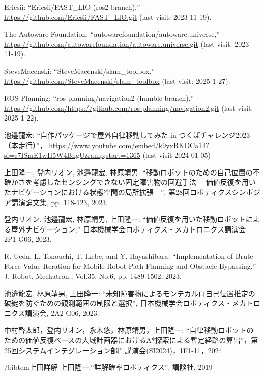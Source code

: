 \documentclass[twocolumn,9pt]{jsproceedings}
\begin{document}
\begin{thebibliography}{99}
  Ericsii: ``Ericsii/FAST\_LIO (ros2 branch),'' \url{https://github.com/Ericsii/FAST_LIO.git} (last visit: 2023-11-19).

  The Autoware Foundation: ``autowarefoundation/autoware.universe,'' \url{https://github.com/autowarefoundation/autoware.universe.git} (last visit: 2023-11-19).

  SteveMacenski: ``SteveMacenski/slam\_toolbox,'' \url{https://github.com/SteveMacenski/slam_toolbox} (last visit: 2025-1-27).

  ROS Planning: ``ros-planning/navigation2 (humble branch),'' \url{https://github.com/https://github.com/ros-planning/navigation2.git} (last visit: 2025-1-22).


  池邉龍宏: ``自作パッケージで屋外自律移動してみた in つくばチャレンジ2023（本走行）''，
  \url{https://www.youtube.com/embed/k9yxRKOCa14?si=c7ISmE1wH5W4BhgU&amp;start=1365} (last visit 2024-01-05)

上田隆一, 登内リオン, 池邉龍宏, 林原靖男: ``移動ロボットのための自己位置の不確かさを考慮したセンシングできない固定障害物の回避手法 ---価値反復を用いたナビゲーションにおける状態空間の局所拡張---'', 第28回ロボティクスシンポジア講演論文集, pp. 118-123, 2023.

  登内リオン, 池邉龍宏, 林原靖男, 上田隆一: ``価値反復を用いた移動ロボットによる屋外ナビゲーション,''
  日本機械学会ロボティクス・メカトロニクス講演会, 2P1-G06, 2023.

  R. Ueda, L. Tonouchi, T. Ikebe, and Y. Hayashibara: ``Implementation of Brute-Force Value Iteration for Mobile Robot Path Planning and Obstacle Bypassing,''
  J. Robot. Mechatron., Vol.35, No.6, pp. 1489-1502, 2023.

  池邉龍宏, 林原靖男, 上田隆一: ``未知障害物によるモンテカルロ自己位置推定の破綻を防ぐための観測範囲の制限と選択'',
  日本機械学会ロボティクス・メカトロニクス講演会, 2A2-G06, 2023.

    中村啓太郎，登内リオン，永木悠，林原靖男，上田隆一: ``自律移動ロボットのための価値反復ベースの大域計画器におけるA*探索による暫定経路の算出''，第25回システムインテグレーション部門講演会(SI2024)，1F1-11，2024

    /bibtem{上田詳解}
    上田隆一:``詳解確率ロボティクス'', 講談社, 2019
\end{thebibliography}
\normalsize
\end{document}
